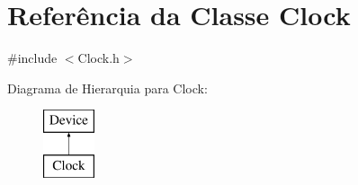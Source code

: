 \hypertarget{classClock}{\section{Referência da Classe Clock}
\label{classClock}
}


{\ttfamily \#include $<$Clock.\-h$>$}

Diagrama de Hierarquia para Clock\-:\begin{figure}[H]
\begin{center}
\leavevmode
\includegraphics[height=2.000000cm]{classClock}
\end{center}
\end{figure}
